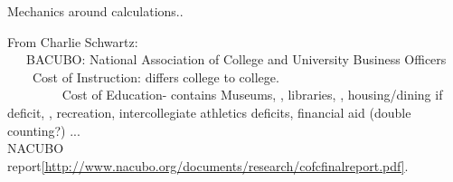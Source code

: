 \documentclass[hyperref={colorlinks}]{beamer}
\newcommand{\skippause}{\vskip5pt
\pause}
\begin{document}
\begin{frame}{Mechanics around calculations..}

\skippause
From Charlie Schwartz: \\
~~~BACUBO: National Association of College and University Business Officers \\
\skippause
~~~~Cost of Instruction: differs college to college. \\ 
~~~~
~~~~Cost of Education- contains \pause Museums, \pause, libraries, \pause, housing/dining if deficit, \pause, recreation, \pause intercollegiate athletics deficits, \pause financial aid (double counting?) \pause ... \\
\skippause
NACUBO report\ref{http://www.nacubo.org/documents/research/cofcfinalreport.pdf}.

\end{frame}
\end{document}
